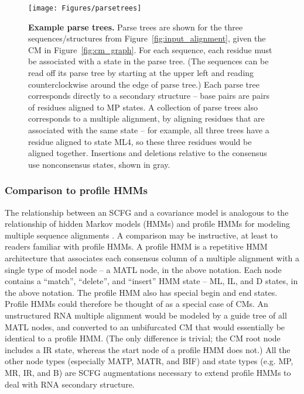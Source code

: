 \documentclass[11pt]{article}
\begin{document}
\begin{figure}[t]
\begin{center}
\texttt{[image: Figures/parsetrees]}
\end{center}
\caption{\textbf{Example parse trees.} Parse trees are shown for the
three sequences/structures from Figure~\ref{fig:input_alignment},
given the CM in Figure~\ref{fig:cm_graph}. For each sequence, each
residue must be associated with a state in the parse tree. (The
sequences can be read off its parse tree by starting at the upper left
and reading counterclockwise around the edge of parse tree.) Each
parse tree corresponds directly to a secondary structure -- base pairs
are pairs of residues aligned to MP states. A collection of parse
trees also corresponds to a multiple alignment, by aligning residues
that are associated with the same state -- for example, all three
trees have a residue aligned to state ML4, so these three residues
would be aligned together. Insertions and deletions relative to the
consensus use nonconsensus states, shown in gray.}
\label{fig:parsetrees}
\end{figure}

\subsubsection{Comparison to profile HMMs}

The relationship between an SCFG and a covariance model is analogous
to the relationship of hidden Markov models (HMMs) and profile HMMs
for modeling multiple sequence alignments
\cite{Krogh94,Durbin98,Eddy98}. A comparison may be instructive, at
least to readers familiar with profile HMMs.  A profile HMM is a
repetitive HMM architecture that associates each consensus column of a
multiple alignment with a single type of model node -- a MATL node, in
the above notation. Each node contains a ``match'', ``delete'', and
``insert'' HMM state -- ML, IL, and D states, in the above notation.
The profile HMM also has special begin and end states. Profile HMMs
could therefore be thought of as a special case of CMs. An
unstructured RNA multiple alignment would be modeled by a guide tree
of all MATL nodes, and converted to an unbifurcated CM that would
essentially be identical to a profile HMM. (The only difference is
trivial; the CM root node includes a IR state, whereas the start node
of a profile HMM does not.) All the other node types (especially MATP,
MATR, and BIF) and state types (e.g. MP, MR, IR, and B) are SCFG
augmentations necessary to extend profile HMMs to deal with RNA
secondary structure.
\end{document}
